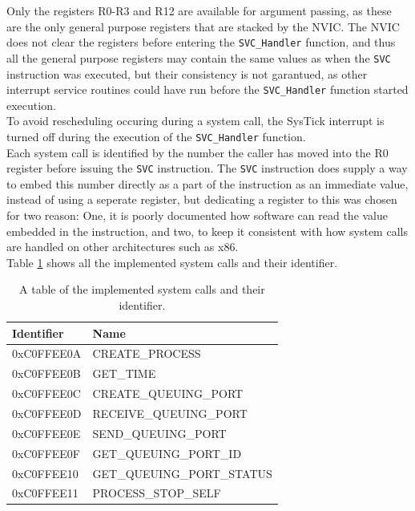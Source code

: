 Only the registers R0-R3 and R12 are available for argument passing, as these
are the only general purpose registers that are stacked by the NVIC. The NVIC
does not clear the registers before entering the \texttt{SVC\_Handler} function,
and thus all the general purpose registers may contain the same values as when
the \texttt{SVC} instruction was executed, but their consistency is not
garantued, as other interrupt service routines could have run before the
\texttt{SVC\_Handler} function started execution.\\
To avoid rescheduling occuring during a system call, the SysTick interrupt is
turned off during the execution of the \texttt{SVC\_Handler} function.\\
Each system call is identified by the number the caller has moved into the R0
register before issuing the \texttt{SVC} instruction. The \texttt{SVC}
instruction does supply a way to embed this number directly as a part of the
instruction as an immediate value, instead of using a seperate register, but
dedicating a register to this was chosen for two reason: One, it is poorly
documented how software can read the value embedded in the instruction, and two,
to keep it consistent with how system calls are handled on other architectures
such as x86.\\
Table \ref{tab:syscalls} shows all the implemented system calls and their
identifier.

\begin{table}
\centering
	\begin{tabular}{| l | l |}
		\hline
		Identifier		&	Name \\
		\hline
		0xC0FFEE0A		&	CREATE\_PROCESS 			\\
		\hline
		0xC0FFEE0B		&	GET\_TIME					\\
		\hline
		0xC0FFEE0C		&	CREATE\_QUEUING\_PORT 		\\
		\hline
		0xC0FFEE0D		&	RECEIVE\_QUEUING\_PORT 		\\
		\hline
		0xC0FFEE0E		&	SEND\_QUEUING\_PORT 		\\
		\hline
		0xC0FFEE0F		&	GET\_QUEUING\_PORT\_ID 		\\
		\hline
		0xC0FFEE10		&	GET\_QUEUING\_PORT\_STATUS	\\
		\hline
		0xC0FFEE11		&	PROCESS\_STOP\_SELF 		\\
		\hline
	\end{tabular}
\caption{A table of the implemented system calls and their identifier.}
\label{tab:syscalls}
\end{table}


